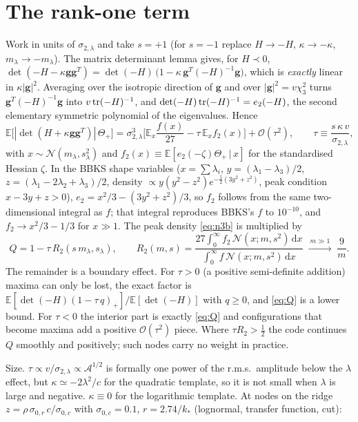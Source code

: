 \documentclass[11pt]{article}
\newcommand{\dd}{\mathrm{d}}
\newcommand{\E}{\mathbb{E}}
\begin{document}
\section{The rank-one term}

Work in units of $\sigma_{2,\lambda}$ and take $s=+1$ (for $s=-1$ replace $H\to-H$, $\kappa\to-\kappa$,
$m_\lambda\to-m_\lambda$). The matrix determinant lemma gives, for $H\prec0$,
$\det(-H-\kappa\bm g\bm g^T)=\det(-H)\,\big(1-\kappa\,\bm g^T(-H)^{-1}\bm g\big)$, which is
\emph{exactly} linear in $\kappa|\bm g|^2$. Averaging over the isotropic direction of $\bm g$ and
over $|\bm g|^2=v\chi^2_3$ turns $\bm g^T(-H)^{-1}\bm g$ into $v\,{\rm tr}(-H)^{-1}$, and
$\det(-H)\,{\rm tr}(-H)^{-1}=e_2(-H)$, the second elementary symmetric polynomial of the
eigenvalues. Hence
\begin{equation}
\E\big[|\det(H+\kappa\bm g\bm g^T)|\,\Theta_+\big]=\sigma_{2,\lambda}^3\Big[\E_x\frac{f(x)}{27}-\tau\,\E_xf_2(x)\Big]
+\mathcal O(\tau^2),\qquad
\tau\equiv\frac{s\,\kappa\,v}{\sigma_{2,\lambda}},
\label{eq:rankone}
\end{equation}
with $x\sim\mathcal N(m_\lambda,s^2_\lambda)$ and $f_2(x)\equiv\E[e_2(-\zeta)\Theta_+\,|\,x]$ for the
standardised Hessian $\zeta$. In the BBKS shape variables ($x=\sum\lambda_i$,
$y=(\lambda_1-\lambda_3)/2$, $z=(\lambda_1-2\lambda_2+\lambda_3)/2$, density
$\propto y(y^2-z^2)e^{-\frac52(3y^2+z^2)}$, peak condition $x-3y+z>0$),
$e_2=x^2/3-(3y^2+z^2)/3$, so $f_2$ follows from the same two-dimensional integral as $f$; that
integral reproduces BBKS's $f$ to $10^{-10}$, and $f_2\to x^2/3-1/3$ for $x\gg1$. The peak
density \eqref{eq:n3b} is multiplied by
\begin{equation}
Q=1-\tau\,R_2(s\,m_\lambda,s_\lambda),\qquad
R_2(m,s)=\frac{27\int_0^\infty f_2\,\mathcal N(x;m,s^2)\,\dd x}{\int_0^\infty f\,\mathcal N(x;m,s^2)\,\dd x}
\;\xrightarrow{\ m\gg1\ }\;\frac9m .
\label{eq:Q}
\end{equation}
The remainder is a boundary effect. For $\tau>0$ (a positive semi-definite addition) maxima can
only be lost, the exact factor is $\E[\det(-H)(1-\tau\,q)_+]/\E[\det(-H)]$ with $q\geq0$, and
\eqref{eq:Q} is a lower bound. For $\tau<0$ the interior part is exactly \eqref{eq:Q} and
configurations that become maxima add a positive $\mathcal O(\tau^2)$ piece. Where
$\tau R_2>\frac12$ the code continues $Q$ smoothly and positively; such nodes carry no weight
in practice.

Size. $\tau\propto v/\sigma_{2,\lambda}\propto\mathcal A^{1/2}$ is formally one power of the r.m.s.\
amplitude below the $\lambda$ effect, but $\kappa\simeq-2\lambda^2/c$ for the quadratic template,
so it is not small when $\lambda$ is large and negative. $\kappa\equiv0$ for the logarithmic
template. At nodes on the ridge $z=\rho\,\sigma_{0,r}\,c/\sigma_{0,c}$ with $\sigma_{0,c}=0.1$,
$r=2.74/k_*$ (lognormal, transfer function, cut):
\end{document}
